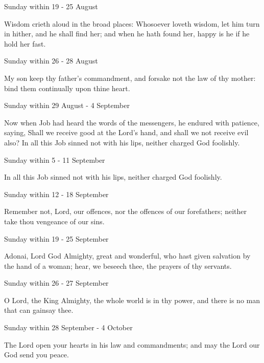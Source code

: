 \begin{multicols}{2}
\begin{inhead}
Sunday within 19 - 25 August
\end{inhead}\par\noindent
Wisdom crieth {\dag} aloud in the broad places: Whosoever loveth wisdom, let him turn in hither, and he shall find her; and when he hath found her, happy is he if he hold her fast.
\begin{inhead}
Sunday within 26 - 28 August
\end{inhead}\par\noindent
My son {\dag} keep thy father's commandment, and forsake not the law of thy mother: bind them continually upon thine heart.
\begin{inhead}
Sunday within 29 August - 4 September
\end{inhead}\par\noindent
Now when Job had heard {\dag} the words of the messengers, he endured with patience, saying, Shall we receive good at the Lord's hand, and shall we not receive evil also? In all this Job sinned not with his lips, neither charged God foolishly.
\begin{inhead}
Sunday within 5 - 11 September
\end{inhead}\par\noindent
In all this {\dag} Job sinned not with his lips, neither charged God foolishly.
\begin{inhead}
Sunday within 12 - 18 September
\end{inhead}\par\noindent
Remember not, {\dag} Lord, our offences, nor the offences of our forefathers; neither take thou vengeance of our sins.
\begin{inhead}
Sunday within 19 - 25 September
\end{inhead}\par\noindent
Adonai, {\dag} Lord God Almighty, great and wonderful, who hast given salvation by the hand of a woman; hear, we beseech thee, the prayers of thy servants.
\begin{inhead}
Sunday within 26 - 27 September
\end{inhead}\par\noindent
O Lord, {\dag} the King Almighty, the whole world is in thy power, and there is no man that can gainsay thee.
\begin{inhead}
Sunday within 28 September - 4 October
\end{inhead}\par\noindent
The Lord open your hearts {\dag} in his law and commandments; and may the Lord our God send you peace.

\end{multicols}
